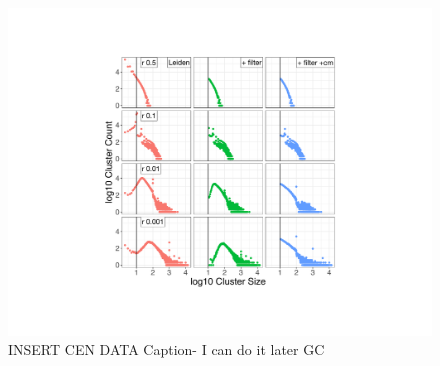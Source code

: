 \documentclass[11pt]{article}   	%
\begin{document}
\begin{figure}[H]
\centering
\includegraphics[width=0.8\linewidth]{figs/fig2_kn.pdf}
\caption{INSERT CEN DATA Caption- I can do it later GC}
\label{fig:oc_size_count_plots}
\end{figure}
\end{document}
